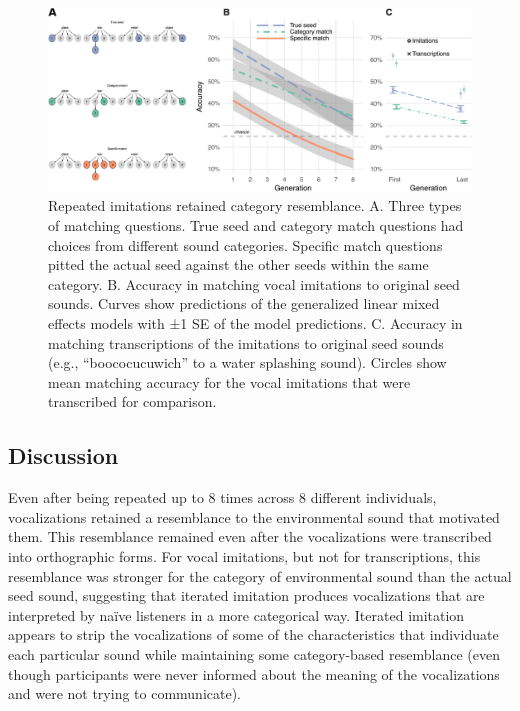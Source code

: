 \documentclass[english,floatsintext,man]{apa6}
\theoremstyle{definition}
\theoremstyle{definition}
\theoremstyle{definition}
\theoremstyle{remark}
\begin{document}
\begin{figure}
\centering
\includegraphics{fig3-1.pdf}
\caption{\label{fig:fig3}Repeated imitations retained category resemblance.
A. Three types of matching questions. True seed and category match
questions had choices from different sound categories. Specific match
questions pitted the actual seed against the other seeds within the same
category. B. Accuracy in matching vocal imitations to original seed
sounds. Curves show predictions of the generalized linear mixed effects
models with ±1 SE of the model predictions. C. Accuracy in matching
transcriptions of the imitations to original seed sounds (e.g.,
\enquote{boococucuwich} to a water splashing sound). Circles show mean
matching accuracy for the vocal imitations that were transcribed for
comparison.}
\end{figure}

\hypertarget{discussion-1}{%
\subsection{Discussion}\label{discussion-1}}

Even after being repeated up to 8 times across 8 different individuals,
vocalizations retained a resemblance to the environmental sound that
motivated them. This resemblance remained even after the vocalizations
were transcribed into orthographic forms. For vocal imitations, but not
for transcriptions, this resemblance was stronger for the category of
environmental sound than the actual seed sound, suggesting that iterated
imitation produces vocalizations that are interpreted by naïve listeners
in a more categorical way. Iterated imitation appears to strip the
vocalizations of some of the characteristics that individuate each
particular sound while maintaining some category-based resemblance (even
though participants were never informed about the meaning of the
vocalizations and were not trying to communicate).
\end{document}
